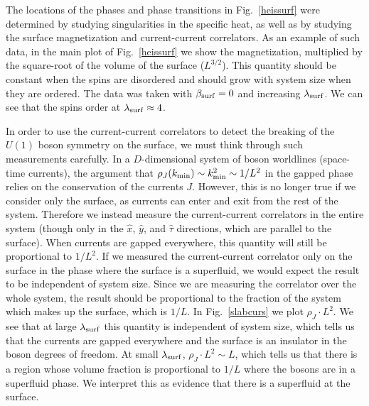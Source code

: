The locations of the phases and phase transitions in Fig.~\ref{heissurf} were determined by studying singularities in the specific heat, as well as by studying the surface magnetization and current-current correlators. As an example of such data, in the main plot of Fig.~\ref{heissurf} we show the magnetization, multiplied by the square-root of the volume of the surface ($L^{3/2}$). This quantity should be constant when the spins are disordered and should grow with system size when they are ordered. The data was taken with $\beta_{\rm surf}=0$ and increasing $\lambda_{\rm surf}$. We can see that the spins order at $\lambda_{\rm surf} \approx 4$. 

In order to use the current-current correlators to detect the breaking of the $U(1)$ boson symmetry on the surface, we must think through such measurements carefully.  In a $D$-dimensional system of boson worldlines (space-time currents), the argument that $\rho_J(k_{\rm min}) \sim k_{\rm min}^2 \sim 1/L^2$ in the gapped phase relies on the conservation of the currents $J$.  However, this is no longer true if we consider only the surface, as currents can enter and exit from the rest of the system.  
Therefore we instead measure the current-current correlators in the entire system (though only in the $\hat{x}$, $\hat{y}$, and $\hat{\tau}$ directions, which are parallel to the surface). When currents are gapped everywhere, this quantity will still be proportional to $1/L^2$. 
If we measured the current-current correlator only on the surface in the phase where the surface is a superfluid, we would expect the result to be independent of system size. Since we are measuring the correlator over the whole system, the result should be proportional to the fraction of the system which makes up the surface, which is $1/L$.
In Fig.~\ref{slabcurs} we plot $\rho_J \cdot L^2$. We see that at large $\lambda_{\rm surf}$ this quantity is independent of system size, which tells us that the currents are gapped everywhere and the surface is an insulator in the boson degrees of freedom. At small $\lambda_{\rm surf}$, $\rho_J\cdot L^2 \sim L$, which tells us that there is a region whose volume fraction is proportional to $1/L$ where the bosons are in a superfluid phase. We interpret this as evidence that there is a superfluid at the surface.


